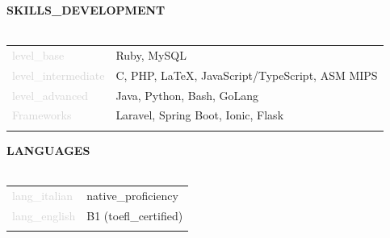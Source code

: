 \documentclass{article}
\begin{document}
\textbf{\textcolor{deepblue}{\uppercase{{{skills_development}}}}} \\\\ \hfill
\begin{tabular}{ R{4cm} L{11cm} }
	\textcolor{lightgray}{{{level_base}}} & Ruby, MySQL \\ \hfill
	\textcolor{lightgray}{{{level_intermediate}}} & C, PHP, LaTeX, JavaScript/TypeScript, ASM MIPS \\ \hfill
	\textcolor{lightgray}{{{level_advanced}}} & Java, Python, Bash, GoLang \\[.5cm] \hfill
	\textcolor{lightgray}{Frameworks} & Laravel, Spring Boot, Ionic, Flask \\ \hfill
\end{tabular}

\textbf{\textcolor{deepblue}{\uppercase{{{languages}}}}} \\\\ \hfill
\begin{tabular}{ R{4cm} L{11cm} }
	\textcolor{lightgray}{{{lang_italian}}} & {{native_proficiency}} \\ \hfill
	\textcolor{lightgray}{{{lang_english}}} & B1 ({{toefl_certified}})\\ \hfill
\end{tabular}
\end{document}
